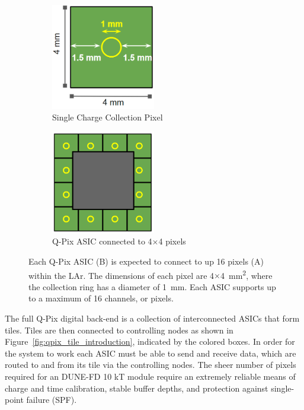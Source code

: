 \begin{figure}[]
\centering
\begin{subfigure}{.5\textwidth}
  \centering
  \includegraphics[width=0.5\textwidth]{images/single_pixel_dimensions_qpix.png}
  \caption{Single Charge Collection Pixel}
\end{subfigure}%
\begin{subfigure}{.5\textwidth}
  \centering
  \includegraphics[width=0.5\textwidth]{images/single_asic_dimensions_qpix.png}
  \caption{Q-Pix ASIC connected to 4$\times$4 pixels}
\end{subfigure}
\caption{Each Q-Pix ASIC (B) is expected to connect to up 16 pixels (A) within the LAr.
The dimensions of each pixel are 4$\times$4~\unit{mm^2}, where the collection ring has a diameter of 1~\unit{mm}.
Each ASIC supports up to a maximum of 16 channels, or pixels.
}
\label{fig:qpix_asic_introduction}
\end{figure}

The full Q-Pix digital back-end is a collection of interconnected ASICs that form tiles.
Tiles are then connected to controlling nodes as shown in Figure~\ref{fig:qpix_tile_introduction}, indicated by the colored boxes.
In order for the system to work each ASIC must be able to send and receive data, which are routed to and from its tile via the controlling nodes.
The sheer number of pixels required for an DUNE-FD 10 kT module require an extremely reliable means of charge and time calibration, stable buffer depths, and protection against single-point failure (SPF).

